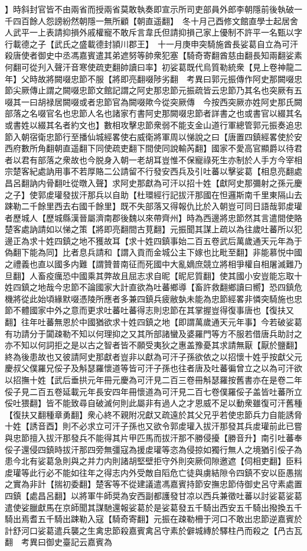 】時斜封官皆不由兩省而授兩省莫敢執奏即宣示所司吏部員外郎李朝隱前後執破一千四百餘人怨謗紛然朝隱一無所顧【朝直遥翻】　冬十月己酉修文館直學士起居舍人武平一上表請抑損外戚權寵不敢斥言韋氏但請抑損己家上優制不許平一名甄以字行載德之子【武氏之盛載德封頴川郡王】　十一月庚申突騎施酋長娑葛自立為可汗殺唐使者御史中丞馮嘉賓遣其弟遮努等帥衆犯塞【騎奇寄翻酋慈由翻長知兩翻娑素何翻可從刋入聲汗音寒使疏吏翻帥讀曰率】初娑葛既代烏質勒統衆【見上卷神龍二年】父時故將闕啜忠節不服【將即亮翻啜陟劣翻　考異曰郭元振傳作阿史那闕啜忠節尖厥傳止謂之闕啜忠節文館記謂之阿史那忠節元振疏皆云忠節乃其名也突厥有五啜其一曰胡禄居闕啜或者忠節官為闕啜歟今從突厥傳　今按西突厥亦姓阿史那氏闕部落之名啜官名也忠節人名也諸家冇書阿史那闕啜忠節者詳書之也或書官以綴其名或書姓以綴其名者約文也】數相攻擊忠節衆弱不能支金山道行軍總管郭元振奏追忠節入朝宿衛忠節行至播仙城經畧使右威衛將軍周以悌說之曰【唐置四鎮經畧使於安西府數所角翻朝直遥翻下同使疏吏翻下間使同說輸芮翻】國家不愛高官顯爵以待君者以君有部落之衆故也今脱身入朝一老胡耳豈惟不保寵祿死生亦制於人手方今宰相宗楚客紀處訥用事不若厚賂二公請留不行發安西兵及引吐蕃以擊娑葛【相息亮翻處昌呂翻訥内骨翻吐從暾入聲】求阿史那獻為可汗以招十姓【獻阿史那彌射之孫元慶之子】使郭䖍瓘發拔汗那兵以自助【杜環經行記拔汗那國在怛邏斯南千里東隔山去踈勒二千餘里西去右國千餘里】既不失部落又得報仇比於入朝豈可同日語哉郭䖍瓘者歷城人【歷城縣漢晉屬濟南郡後魏以來帶齊州】時為西邊將忠節然其言遣間使賂楚客處訥請如以悌之策【將即亮翻間古莧翻】元振聞其謀上疏以為往歲吐蕃所以犯邊正為求十姓四鎮之地不獲故耳【求十姓四鎮事始二百五卷武后萬歲通天元年為于偽翻下能為同】比者息兵請和【謂入貢而金城公主下嫁也比毗至翻】非能慕悦中國之禮義也直以國多内難【謂贊普南征而死國中大亂嫡庶競立將相爭權自相屠滅難乃旦翻】人畜疫癘恐中國乘其弊故且屈志求自昵【昵尼質翻】使其國小安豈能忘取十姓四鎮之地哉今忠節不論國家大計直欲為吐蕃鄉導【畜許救翻鄉讀曰嚮】恐四鎮危機將從此始頃緣默啜憑陵所應者多兼四鎮兵疲敝埶未能為忠節經畧非憐突騎施也忠節不體國家中外之意而更求吐蕃吐蕃得志則忠節在其掌握豈得復事唐也【復扶又翻】往年吐蕃無恩於中國猶欲求十姓四鎮之地【即謂萬歲通天元年事】今若破娑葛有功請分于闐疎勒不知以何理抑之又其所部諸蠻及婆羅門等方不服若借唐兵助討之亦不知以何詞拒之是以古之智者皆不願受夷狄之惠盖豫憂其求請無厭【厭於鹽翻】終為後患故也又彼請阿史那獻者豈非以獻為可汗子孫欲依之以招懷十姓乎按獻父元慶叔父僕羅兄俀子及斛瑟羅懷道等皆可汗子孫也往者唐及吐蕃徧曾立之以為可汗欲以招撫十姓【武后垂拱元年冊元慶為可汗見二百三卷冊斛瑟羅按舊書亦在是卷二年俀子見二百五卷延載元年長安四年冊懷道為可汗見二百七卷僕羅俀子盖皆吐蕃所立俀吐猥翻】皆不能致尋自破滅何則此屬非有過人之才恩威不足以動衆雖復可汗舊種【復扶又翻種章勇翻】衆心終不親附况獻又疏遠於其父兄乎若使忠節兵力自能誘脅十姓【誘音酉】則不必求立可汗子孫也又欲令郭䖍瓘入拔汗那發其兵䖍瓘前此已嘗與忠節擅入拔汗那發兵不能得其片甲匹馬而拔汗那不勝侵擾【勝音升】南引吐蕃奉俀子還侵四鎮時拔汗那四旁無彊寇為援䖍瓘等恣為侵掠如獨行無人之境猶引俀子為患今北有娑葛急則與之并力内則諸胡堅壁拒守外則突厥伺隙邀遮【伺相吏翻】臣料䖍瓘等此行必不能如往年之得志内外受敵自䧟危亡徒與虜結隙令四鎮不安以臣愚揣之實為非計【揣初委翻】楚客等不從建議遣馮嘉賓持節安撫忠節侍御史呂守素處置四鎮【處昌呂翻】以將軍牛師奨為安西副都護發甘凉以西兵兼徵吐蕃以討娑葛娑葛遣使娑臘獻馬在京師聞其謀馳還報娑葛於是娑葛發五千騎出西安五千騎出撥換五千騎出焉耆五千騎出踈勒入寇【騎奇寄翻】元振在疎勒柵于河口不敢出忠節逆嘉賓於計舒河口娑葛遣兵襲之生禽忠節殺嘉賓禽呂守素於僻城縳於驛柱冎而殺之【冎古瓦翻　考異曰御史臺記云嘉賓為